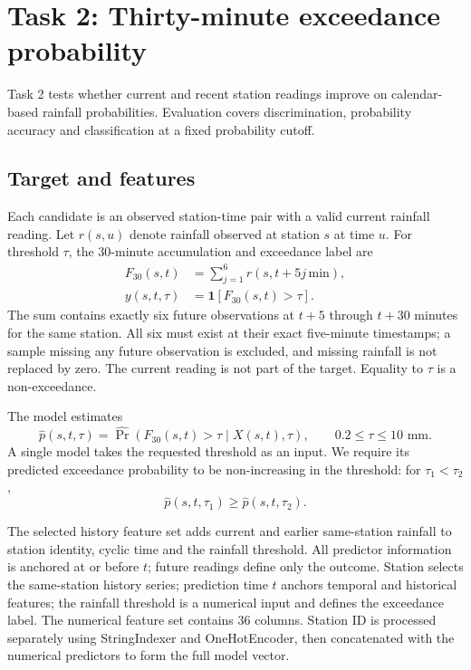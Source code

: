 \documentclass[11pt,a4paper]{article}
\begin{document}
\section{Task 2: Thirty-minute exceedance probability}
Task 2 tests whether current and recent station readings improve on
calendar-based rainfall probabilities. Evaluation covers discrimination,
probability accuracy and classification at a fixed probability cutoff.

\subsection{Target and features}
Each candidate is an observed station-time pair with a valid current rainfall
reading. Let $r(s,u)$ denote rainfall observed at station $s$ at time $u$.
For threshold $\tau$, the 30-minute accumulation and exceedance label are
\[
  \begin{aligned}
    F_{30}(s,t)
    &= \sum_{j=1}^{6} r(s,t+5j\,\mathrm{min}),\\
    y(s,t,\tau)
    &= \mathbf{1}\left[F_{30}(s,t) > \tau\right].
  \end{aligned}
\]
The sum contains exactly six future observations at $t+5$ through $t+30$
minutes for the same station. All six must exist at their exact five-minute
timestamps; a sample missing any future observation is excluded, and missing
rainfall is not replaced by zero. The current reading is not part of the
target. Equality to $\tau$ is a non-exceedance.

The model estimates
\[
  \hat p(s,t,\tau)=\widehat{\Pr}\!\left(
  F_{30}(s,t)>\tau\mid X(s,t),\tau\right),
  \qquad 0.2\leq\tau\leq10\text{ mm}.
\]
A single model takes the requested threshold as an input. We require its
predicted exceedance probability to be non-increasing in the threshold: for
$\tau_1<\tau_2$,
\[
  \hat p(s,t,\tau_1)\geq\hat p(s,t,\tau_2).
\]

The selected history feature set adds current and earlier same-station rainfall
to station identity, cyclic time and the rainfall threshold. All predictor
information is anchored at or before $t$; future readings define only the
outcome. Station selects the same-station history series; prediction time $t$
anchors temporal and historical features; the rainfall threshold is a
numerical input and defines the exceedance label. The numerical feature set
contains 36 columns. Station ID is processed separately using StringIndexer
and OneHotEncoder, then concatenated with the numerical predictors to form the
full model vector.
\end{document}
